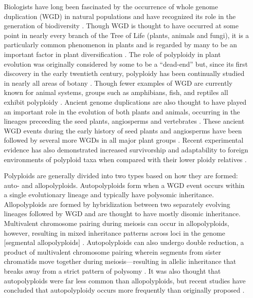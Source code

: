 \documentclass[11pt,english,letterpaper,oneside]{article}
\begin{document}
Biologists have long been fascinated by the occurrence of whole genome duplication (WGD) in natural populations and have recognized its role in the generation of biodiversity \citep{ClausKeckHies1940,StebbinsVariationEvolution,GrantPlantSpeciation,otto2000polyploidy}. Though WGD is thought to have occurred at some point in nearly every branch of the Tree of Life (plants, animals and fungi), it is a particularly common phenomenon in plants and is regarded by many to be an important factor in plant diversification \citep{wood2009polyploid,soltisd2009diversification,scarpino2014polyploid}. The role of polyploidy in plant evolution was originally considered by some to be a ``dead-end'' \citep{StebbinsVariationEvolution,wagner1970noise,soltisd2014stebbins} but, since its first discovery in the early twentieth century, polyploidy has been continually studied in nearly all areas of botany \citep{winge1917polyploidy,Winkler1916polyploidy,ClausKeckHies1945polyploidy,GrantPlantSpeciation,StebbinsVariationEvolution,soltisD2003polyploid,soltisd2010polyploidUnknowns,soltai2009roleOfHybridization,ramsey2014polEcoProcRoySoc}. Though fewer examples of WGD are currently known for animal systems, groups such as amphibians, fish, and reptiles all exhibit polyploidy \citep{allendorf1984tetraploidFish,gregory2005polyploidyAnimals}. Ancient genome duplications are also thought to have played an important role in the evolution of both plants and animals, occurring in the lineages preceeding the seed plants, angiosperms and vertebrates \citep{ohno1970geneDuplication,otto2000polyploidy,furlong2001animalOctoploid,jiao2011ancientWGD}. These ancient WGD events during the early history of seed plants and angiosperms have been followed by several more WGDs in all major plant groups \citep{cui2006genomeDuplication,scarpino2014polyploid,canon2014polyploidyLegumes}. Recent experimental evidence has also demonstrated increased survivorship and adaptability to foreign environments of polyploid taxa when compared with their lower ploidy relatives \citep{ramsey2011polyploidEcology,Selmecki2015yeastAdaptation}.
\medskip

Polyploids are generally divided into two types based on how they are formed: auto- and allopolyploids. Autopolyploids form when a WGD event occurs within a single evolutionary lineage and typically have polysomic inheritance. Allopolyploids are formed by hybridization between two separately evolving lineages followed by WGD and are thought to have mostly disomic inheritance. Multivalent chromosome pairing during meiosis can occur in allopolyploids, however, resulting in mixed inheritance patterns across loci in the genome [segmental allopolyploids] \citep{StebbinsVariationEvolution}. Autopolyploids can also undergo double reduction, a product of multivalent chromosome pairing wherein segments from sister chromatids move together during meiosis---resulting in allelic inheritance that breaks away from a strict pattern of polysomy \citep{haldane1930autopolyploids}. It was also thought that autopolyploids were far less common than allopolyploids, but recent studies have concluded that autopolyploidy occurs more frequently than originally proposed \citep{soltis2007autopolyploidy,parisod2010autopolyploidy}.
\medskip
\end{document}
